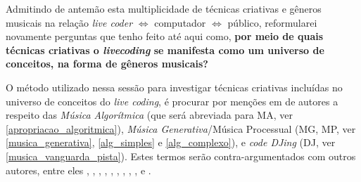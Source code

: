 Admitindo de antemão esta multiplicidade de técnicas criativas e gêneros musicais na relação \emph{live coder} $\Leftrightarrow$ computador $\Leftrightarrow$ público, reformularei novamente perguntas que tenho feito até aqui como, \textbf{por meio de quais técnicas criativas o \emph{livecoding} se manifesta como um universo de conceitos, na forma de gêneros musicais?} 

O método utilizado nessa sessão para investigar técnicas criativas incluídas no universo de conceitos do \emph{live coding}, é procurar por menções em de autores a respeito das \emph{Música Algorítmica} (que será abreviada para MA, ver \autoref{apropriacao_algoritmica}), \emph{Música Generativa}/Música Processual (MG, MP, ver \autoref{musica_generativa}, \autoref{alg_simples} e \autoref{alg_complexo}), e \emph{code DJing} (DJ, ver \autoref{musica_vanguarda_pista}). Estes termos serão contra-argumentados com outros autores, entre eles , , , ,  , , ,  , ,  e  . 